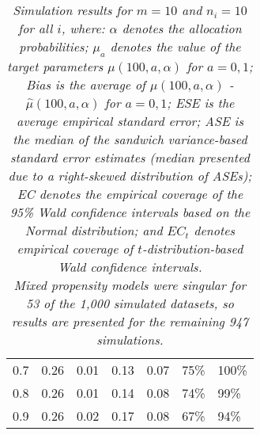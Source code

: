 \documentclass[12pt, letterpaper]{article}
\begin{document}
\begin{table}[ht!]
\begin{tabular}{rrrrrll}
  0.7 & 0.26 & 0.01 & 0.13 & 0.07 & 75\% & 100\% \\ 
  0.8 & 0.26 & 0.01 & 0.14 & 0.08 & 74\% & 99\% \\ 
  0.9 & 0.26 & 0.02 & 0.17 & 0.08 & 67\% & 94\% \\ 
   \hline
\end{tabular}
\egroup
\caption*{\textit{Simulation results for $m = 10$ and $n_i = 10$ for all $i$, where: $\alpha$ denotes the allocation probabilities; $\mu_a$ denotes the value of the target parameters $\mu(100, a, \alpha)$ for $a=0,1$; Bias is the average of $\mu(100, a, \alpha)$ - $\hat{\mu}(100, a, \alpha)$ for $a=0, 1$; ESE is the average empirical standard error; ASE is the median of the sandwich variance-based standard error estimates (median presented due to a right-skewed distribution of ASEs); EC denotes the empirical coverage of the 95\% Wald confidence intervals based on the Normal distribution; and $EC_t$ denotes empirical coverage of $t$-distribution-based Wald confidence intervals.} \\ 

\textit{Mixed propensity models were singular for 53 of the 1,000 simulated datasets, so results are presented for the remaining 947 simulations.}}
\end{table}

\clearpage

\end{document}
